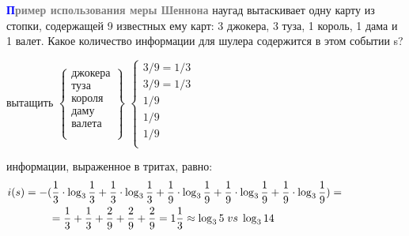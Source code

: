 \begin{frame}{\hspace{4.5cm}\textbf{\textcolor{blue}{П}\textcolor{gray}{ример использования меры Шеннона}}}
    \fontsize{9pt}{11pt}\selectfont
    \setlength{\parindent}{3ex}
     наугад вытаскивает одну карту из стопки, содержащей 9 известных ему карт: 3 джокера, 3 туза, 1 король, 1 дама и 1 валет. Какое количество информации для шулера содержится в этом событии s?
    
    \medskip
     вытащить \quad$\left\{\begin{array}{l}
        \text{джокера} \\
        \text{туза} \\
        \text{короля} \\
        \text{даму} \\
        \text{валета} \\
        \text{ } \\
        \text{ }
    \end{array}\right\}$  \quad$\left\{\begin{array}{l}
        3/9 = 1/3 \\
        3/9 = 1/3 \\
        1/9 \\
        1/9 \\
        1/9 \\
        \text{ }
    \end{array}\right.$
    
    \smallskip
     информации, выраженное в тритах, равно:\\
    \begin{align*}
        i(s) = -(\frac{1}{3}\cdot\log_3 \frac{1}{3} + \frac{1}{3}\cdot\log_3 \frac{1}{3} + \frac{1}{9}\cdot\log_3 \frac{1}{9} + \frac{1}{9}\cdot\log_3 \frac{1}{9} + \frac{1}{9}\cdot\log_3 \frac{1}{9}) =\hspace{2cm}\\
        = \frac{1}{3} + \frac{1}{3} + \frac{2}{9} + \frac{2}{9} + \frac{2}{9} = 1  \frac{1}{3} \approx \log_3 5 \hspace{1mm}vs \hspace{1mm}\log_3 14\hspace{4.2cm}
    \end{align*}
    
\end{frame}
